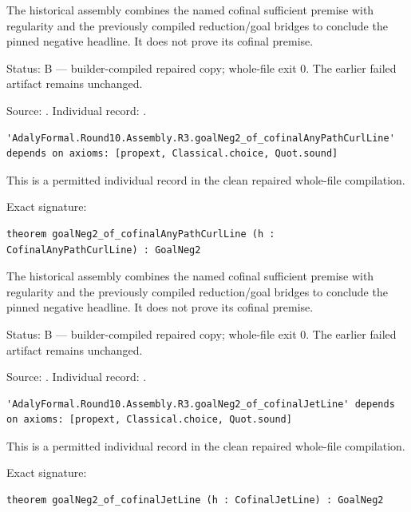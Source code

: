 \begin{theorem}
\label{join-7}
\leanok
The historical assembly combines the named cofinal sufficient premise with regularity and the previously compiled reduction/goal bridges to conclude the pinned negative headline. It does not prove its cofinal premise.
\par Status: B — builder-compiled repaired copy; whole-file exit 0. The earlier failed artifact remains unchanged.
\par Source: \texttt{}. Individual record: \texttt{}.
\begin{verbatim}
'AdalyFormal.Round10.Assembly.R3.goalNeg2_of_cofinalAnyPathCurlLine' depends on axioms: [propext, Classical.choice, Quot.sound]
\end{verbatim}
This is a permitted individual record in the clean repaired whole-file compilation.
\par Exact signature:
\begin{verbatim}
theorem goalNeg2_of_cofinalAnyPathCurlLine (h : CofinalAnyPathCurlLine) : GoalNeg2
\end{verbatim}
\end{theorem}

\begin{theorem}
\label{join-8}
\leanok
The historical assembly combines the named cofinal sufficient premise with regularity and the previously compiled reduction/goal bridges to conclude the pinned negative headline. It does not prove its cofinal premise.
\par Status: B — builder-compiled repaired copy; whole-file exit 0. The earlier failed artifact remains unchanged.
\par Source: \texttt{}. Individual record: \texttt{}.
\begin{verbatim}
'AdalyFormal.Round10.Assembly.R3.goalNeg2_of_cofinalJetLine' depends on axioms: [propext, Classical.choice, Quot.sound]
\end{verbatim}
This is a permitted individual record in the clean repaired whole-file compilation.
\par Exact signature:
\begin{verbatim}
theorem goalNeg2_of_cofinalJetLine (h : CofinalJetLine) : GoalNeg2
\end{verbatim}
\end{theorem}

